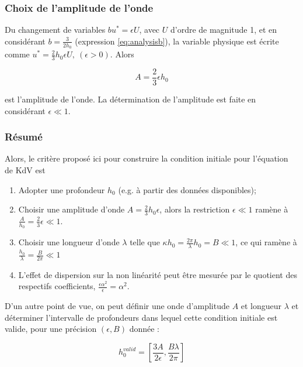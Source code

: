 \subsubsection{Choix de l'amplitude de l'onde}

\indent Du changement de variables $bu^* = \epsilon U$, avec $U$ d'ordre de magnitude 1, et en considérant $b = \frac{3}{2h_0}$ (expression \ref{eq:analysisb}), la variable physique est écrite comme $u^* = \frac{2}{3}h_0\epsilon U, \ (\epsilon > 0)$. Alors

\begin{equation*}
A = \frac{2}{3}\epsilon h_0
\end{equation*}

\noindent est l'amplitude de l'onde. La détermination de l'amplitude est faite en considérant $\epsilon \ll 1$. 

\subsubsection{Résumé}

\indent Alors, le critère proposé ici pour construire la condition initiale pour l'équation de KdV est 

\begin{enumerate}
\item Adopter une profondeur $h_0$ (e.g. à partir des données disponibles);
\item Choisir une amplitude d'onde $A = \frac{2}{3}h_0\epsilon$, alors la restriction $\epsilon \ll 1$ ramène à $\frac{A}{h_0} = \frac{2}{3}\epsilon \ll 1$.
\item Choisir une longueur d'onde $\lambda$ telle que $\kappa h_0 = \frac{2\pi}{\lambda}h_0 = B \ll 1$, ce qui ramène à $\frac{h_0}{\lambda} = \frac{B}{2\pi} \ll 1$
\item L'effet de dispersion sur la non linéarité peut être mesurée par le quotient des respectifs coefficients, $\frac{\epsilon \alpha^2}{\epsilon} = \alpha^2$.
\end{enumerate}

\indent D'un autre point de vue, on peut définir une onde d'amplitude  $A$ et longueur $\lambda$ et déterminer l'intervalle de profondeurs dans lequel cette condition initiale est valide, pour une précision $(\epsilon,B)$ donnée :

\begin{equation} 
\label{eq:hvalid}
h_0^{valid} = \left[ \frac{3A}{2\epsilon}, \frac{B\lambda}{2\pi}\right]
\end{equation}

